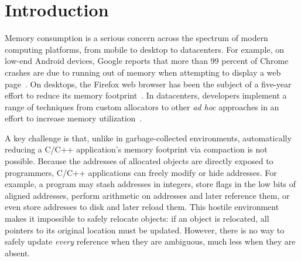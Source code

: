 \section{Introduction}
\label{sec:introduction}

Memory consumption is a serious concern across the spectrum of modern
computing platforms, from mobile to desktop to datacenters. For
example, on low-end Android devices, Google reports that more than 99
percent of Chrome crashes are due to running out of memory when
attempting to display a web page~\cite{hara:stateofblink}. On
desktops, the Firefox web browser has been the subject of a five-year
effort to reduce its memory footprint~\cite{awsy}. In datacenters,
developers implement a range of techniques from custom allocators to
other \emph{ad hoc} approaches in an effort to increase memory
utilization~\cite{jemalloc:exposehints,redis:announcement}.

A key challenge is that, unlike in garbage-collected environments,
automatically reducing a C/C++ application's memory footprint
via compaction is not possible. Because the addresses of allocated
objects are directly exposed to programmers, C/C++ applications can
freely modify or hide addresses.  For example, a program may stash
addresses in integers, store flags in the low bits of aligned
addresses, perform arithmetic on addresses and later reference them,
or even store addresses to disk and later reload them.  This hostile
environment makes it impossible to safely relocate objects: if an
object is relocated, all pointers to its original location must be
updated. However, there is no way to safely update \emph{every}
reference when they are ambiguous, much less when they are absent.

